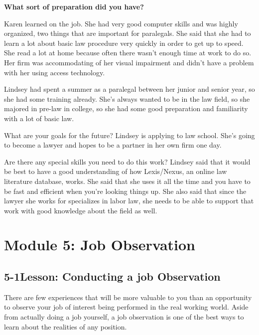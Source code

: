 \textbf{What sort of preparation did you have?} 

Karen learned on the job. She had very good computer skills and was highly organized, two things that are important for paralegals. She said that she had to learn a lot about basic law procedure very quickly in order to get up to speed. She read a lot at home because often there wasn't enough time at work to do so. Her firm was accommodating of her visual impairment and didn't have a problem with her using access technology.

Lindsey had spent a summer as a paralegal between her junior and senior year, so she had some training already. She's always wanted to be in the law field, so she majored in pre-law in college, so she had some good preparation and familiarity with a lot of basic law.

What are your goals for the future? Lindsey is applying to law school. She's going to become a lawyer and hopes to be a partner in her own firm one day.

Are there any special skills you need to do this work? Lindsey said that it would be best to have a good understanding of how Lexis/Nexus, an online law literature database, works. She said that she uses it all the time and you have to be fast and efficient when you're looking things up. She also said that since the lawyer she works for specializes in labor law, she needs to be able to support that work with good knowledge about the field as well.
 
\pagebreak \section*{Module 5:	Job Observation}
\noindent\makebox[\textwidth]{\rule{\linewidth}{0.4pt}}  \localtableofcontents 
\noindent\makebox[\textwidth]{\rule{\linewidth}{0.4pt}} 


\pagebreak \subsection*{5-1\quad Lesson: Conducting a job Observation}
There are few experiences that will be more valuable to you than an opportunity to observe your job of interest being performed in the real working world. Aside from actually doing a job yourself, a job observation is one of the best ways to learn about the realities of any position.

